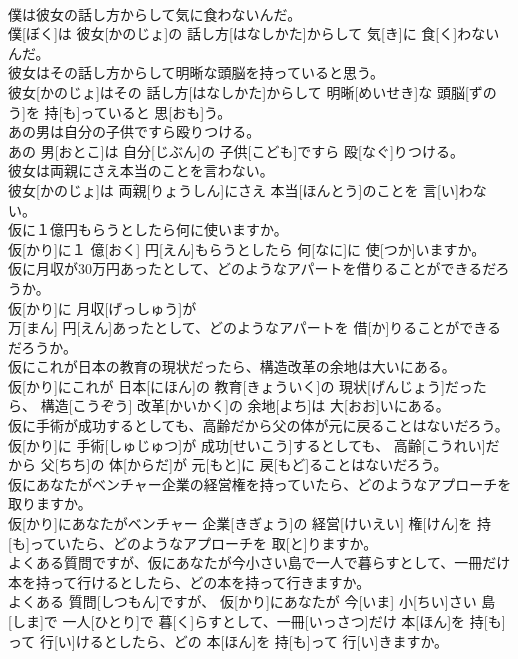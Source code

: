 \documentclass[8pt]{extreport}
\begin{document}
\begin{CJK}{UTF8}{min}
\\	僕は彼女の話し方からして気に食わないんだ。	
\\	僕[ぼく]は 彼女[かのじょ]の 話し方[はなしかた]からして 気[き]に 食[く]わないんだ。
\\	彼女はその話し方からして明晰な頭脳を持っていると思う。	
\\	彼女[かのじょ]はその 話し方[はなしかた]からして 明晰[めいせき]な 頭脳[ずのう]を 持[も]っていると 思[おも]う。
\\	あの男は自分の子供ですら殴りつける。	
\\	あの 男[おとこ]は 自分[じぶん]の 子供[こども]ですら 殴[なぐ]りつける。
\\	彼女は両親にさえ本当のことを言わない。	
\\	彼女[かのじょ]は 両親[りょうしん]にさえ 本当[ほんとう]のことを 言[い]わない。
\\	仮に１億円もらうとしたら何に使いますか。	
\\	仮[かり]に１ 億[おく] 円[えん]もらうとしたら 何[なに]に 使[つか]いますか。
\\	仮に月収が30万円あったとして、どのようなアパートを借りることができるだろうか。	
\\	仮[かり]に 月収[げっしゅう]が 
\\	万[まん] 円[えん]あったとして、どのようなアパートを 借[か]りることができるだろうか。
\\	仮にこれが日本の教育の現状だったら、構造改革の余地は大いにある。	
\\	仮[かり]にこれが 日本[にほん]の 教育[きょういく]の 現状[げんじょう]だったら、 構造[こうぞう] 改革[かいかく]の 余地[よち]は 大[おお]いにある。
\\	仮に手術が成功するとしても、高齢だから父の体が元に戻ることはないだろう。	
\\	仮[かり]に 手術[しゅじゅつ]が 成功[せいこう]するとしても、 高齢[こうれい]だから 父[ちち]の 体[からだ]が 元[もと]に 戻[もど]ることはないだろう。
\\	仮にあなたがベンチャー企業の経営権を持っていたら、どのようなアプローチを取りますか。	
\\	仮[かり]にあなたがベンチャー 企業[きぎょう]の 経営[けいえい] 権[けん]を 持[も]っていたら、どのようなアプローチを 取[と]りますか。
\\	よくある質問ですが、仮にあなたが今小さい島で一人で暮らすとして、一冊だけ本を持って行けるとしたら、どの本を持って行きますか。	
\\	よくある 質問[しつもん]ですが、 仮[かり]にあなたが 今[いま] 小[ちい]さい 島[しま]で 一人[ひとり]で 暮[く]らすとして、一冊[いっさつ]だけ 本[ほん]を 持[も]って 行[い]けるとしたら、どの 本[ほん]を 持[も]って 行[い]きますか。

\end{CJK}
\end{document}

